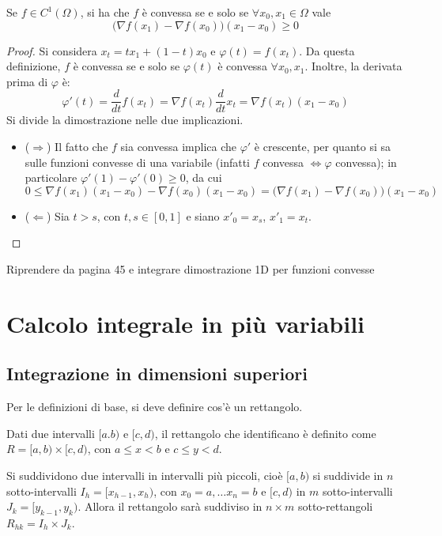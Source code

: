 \documentclass[11pt, a4paper]{scrartcl}
\theoremstyle{definition}
\numberwithin{esempio}{section}
\theoremstyle{definition}
\numberwithin{obs}{section}
\numberwithin{nota}{section}
\numberwithin{equation}{subsection}
\begin{document}
\begin{teorema}
	{}{}
	Se $f \in C^1(\Omega )$, si ha che $f$ \`e convessa se e solo se $\forall x_0,x_1 \in \Omega $ vale
	\[
	\big(\nabla f(x_1) - \nabla f(x_0)\big)(x_1-x_0)\ge 0
	\] 
	\begin{proof}
		Si considera $x_t = tx_1 + (1-t)x_0$ e $\varphi (t) = f(x_t)$.
		Da questa definizione, $f$ \`e convessa se e solo se $\varphi (t)$ \`e convessa $\forall x_0,x_1$.
		Inoltre, la derivata prima di $\varphi $ \`e:
		\[
		\varphi '(t) = \frac{d }{d t} f(x_t) = \nabla f(x_t) \frac{d }{d t} x_t = \nabla f(x_t)(x_1-x_0)
		\] 
		Si divide la dimostrazione nelle due implicazioni.
		\begin{itemize}
			\item ($\Rightarrow $) Il fatto che $f$ sia convessa implica che $\varphi '$ \`e crescente, per quanto si sa sulle funzioni convesse di una variabile (infatti $f$ convessa $\iff \varphi $ convessa); in particolare $\varphi '(1) - \varphi '(0) \ge 0$, da cui
				\[
				0\le \nabla f(x_1) (x_1-x_0) - \nabla f(x_0)(x_1-x_0) = \big(\nabla f(x_1) - \nabla f(x_0)\big)(x_1-x_0)
				\] 
			\item ($\Leftarrow$) Sia $t>s$, con $t,s \in [0,1]$ e siano $x'_0 = x_s$, $x'_1 = x_t$.
		\end{itemize}
	\end{proof}
\end{teorema}
\begin{center}
	\color{asdf} Riprendere da pagina 45 e integrare dimostrazione 1D per funzioni convesse
\end{center}
\newpage 

\section{Calcolo integrale in pi\`u variabili}

\subsection{Integrazione in dimensioni superiori}
Per le definizioni di base, si deve definire cos'\`e un rettangolo.
\begin{definizione}
	{}{}
	Dati due intervalli $[a.b)$ e $[c,d)$, il rettangolo che identificano \`e definito come $R = [a,b) \times  [c,d)$, con $a\le x< b$ e $c\le y<d$.
\end{definizione}
\noindent Si suddividono due intervalli in intervalli pi\`u piccoli, cio\`e $[a,b)$ si suddivide in $n$ sotto-intervalli $I_h = [x_{h-1} ,x_h)$, con $x_0 =a , \ldots x_n = b$ e $[c,d)$ in $m$ sotto-intervalli $J_k = [y_{k-1} ,y_k)$. Allora il rettangolo sar\`a suddiviso in $n\times m$ sotto-rettangoli $R_{hk}  = I_h \times J_k$.
\end{document}
